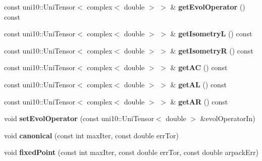 \begin{DoxyCompactItemize}
\item 
const uni10\+::\+Uni\+Tensor$<$ complex$<$ double $>$ $>$ \& {\bfseries get\+Evol\+Operator} () const \hypertarget{classoneSiteiMPS_a360449fdde46bbb67a2839f66b6cb973}{}\label{classoneSiteiMPS_a360449fdde46bbb67a2839f66b6cb973}

\item 
const uni10\+::\+Uni\+Tensor$<$ complex$<$ double $>$ $>$ \& {\bfseries get\+IsometryL} () const \hypertarget{classoneSiteiMPS_a1ceddfab7dd4765ab81b64763cb5d4ac}{}\label{classoneSiteiMPS_a1ceddfab7dd4765ab81b64763cb5d4ac}

\item 
const uni10\+::\+Uni\+Tensor$<$ complex$<$ double $>$ $>$ \& {\bfseries get\+IsometryR} () const \hypertarget{classoneSiteiMPS_ac19bec84d5addcad9588be569e4bf6b7}{}\label{classoneSiteiMPS_ac19bec84d5addcad9588be569e4bf6b7}

\item 
const uni10\+::\+Uni\+Tensor$<$ complex$<$ double $>$ $>$ \& {\bfseries get\+AC} () const \hypertarget{classoneSiteiMPS_a9d0fb845fd811ba744b1c6f9ff70310f}{}\label{classoneSiteiMPS_a9d0fb845fd811ba744b1c6f9ff70310f}

\item 
const uni10\+::\+Uni\+Tensor$<$ complex$<$ double $>$ $>$ \& {\bfseries get\+AL} () const \hypertarget{classoneSiteiMPS_ac0fb7cd0cd625dba9a3aba589111f55a}{}\label{classoneSiteiMPS_ac0fb7cd0cd625dba9a3aba589111f55a}

\item 
const uni10\+::\+Uni\+Tensor$<$ complex$<$ double $>$ $>$ \& {\bfseries get\+AR} () const \hypertarget{classoneSiteiMPS_ab0e8d458b0740b7101b1688d9e66d715}{}\label{classoneSiteiMPS_ab0e8d458b0740b7101b1688d9e66d715}

\item 
void {\bfseries set\+Evol\+Operator} (const uni10\+::\+Uni\+Tensor$<$ double $>$ \&evol\+Operator\+In)\hypertarget{classoneSiteiMPS_a7c713c3bbed8894cbf884742a4b13c5d}{}\label{classoneSiteiMPS_a7c713c3bbed8894cbf884742a4b13c5d}

\item 
void {\bfseries canonical} (const int max\+Iter, const double err\+Tor)\hypertarget{classoneSiteiMPS_ae14eb900d22570bf761a47d1508644eb}{}\label{classoneSiteiMPS_ae14eb900d22570bf761a47d1508644eb}

\item 
void {\bfseries fixed\+Point} (const int max\+Iter, const double err\+Tor, const double arpack\+Err)\hypertarget{classoneSiteiMPS_a403845d9838b8da737513216f4b6d121}{}\label{classoneSiteiMPS_a403845d9838b8da737513216f4b6d121}


\end{DoxyCompactItemize}
